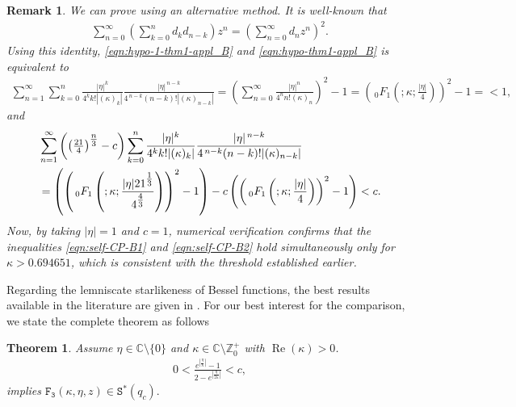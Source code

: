 \documentclass[a4paper,11pt,reqno]{amsart}
\newtheorem{theorem}{Theorem}[section]
\newtheorem{remark}{Remark}[section]
\DeclareMathOperator{\real}{Re}
\begin{document}
\begin{remark}
   We can prove  using an alternative method. It is well-known that 
   \begin{align}\label{eqn:self-CP}
       \sum_{n=0}^{\infty} \left( \sum_{k=0}^n d_k d_{n-k} \right) z^n = \left(\sum_{n=0}^{\infty}  d_n  z^n \right)^2. 
   \end{align}
Using this identity, \eqref{eqn:hypo-1-thm1-appl_B} and  \eqref{eqn:hypo-thm1-appl_B} is equivalent to 
   \begin{align}\label{eqn:self-CP-B1}
\sum_{n=1}^{\infty}  \sum_{k=0}^n  \frac{|\eta|^{k}}{4^k k! |(\kappa)_{k}|}  \frac{|\eta|^{\,n-k}}{4^{\,n-k} (n-k)! |(\kappa)_{n-k}|} =\left(\sum_{n=0}^{\infty} \frac{|\eta|^{n}}{4^n n! (\kappa)_{n}}\right)^2 -1={\left(\, _0F_1\left(;\kappa ;\frac{|\eta|}{4}\right)\right)}^2 -1  = < 1,
\end{align}
and 
\begin{align}\label{eqn:self-CP-B2} \notag
&\sum_{n=1}^{\infty} \left( \left(\tfrac{21}{4}\right)^{\tfrac{n}{3}}- c\right) \sum_{k=0}^n  \frac{|\eta|^{k}}{4^k k! |(\kappa)_{k}|}  \frac{|\eta|^{\,n-k}}{4^{\,n-k} (n-k)! |(\kappa)_{n-k}|}\\&=\left({\left(\, _0F_1\left(;\kappa ;\frac{|\eta| 21^{\tfrac{1}{3}}}{4^{\tfrac{4}{3}}}\right)\right)}^2 -1\right)- c \left( {\left(\, _0F_1\left(;\kappa ;\frac{|\eta|}{4}\right)\right)}^2 -1\right)<c. 
\end{align}
Now, by taking $|\eta|=1$ and $c=1$, numerical verification confirms that the inequalities \eqref{eqn:self-CP-B1} and \eqref{eqn:self-CP-B2} hold simultaneously only for $\kappa >0.694651$, which is consistent with the threshold established earlier. 
\end{remark}
    

















 Regarding the lemniscate starlikeness of Bessel functions, the best results available in the literature are given in \cite{Zayed-Bulboacua}. For our best interest for the comparison, we state the complete theorem as follows

\begin{theorem}\label{thm-Zayed-LS}\cite{Zayed-Bulboacua}
    Assume $\eta \in \mathbb{C}\setminus \{0\}$ and $\kappa \in \mathbb{C}\setminus \mathbb{Z}_0^{+}$ with $\real(\kappa)>0$. 
    \begin{align*}
        0 < \frac{e^{\left|\tfrac{\eta}{\kappa}\right|}-1}{2-e^{\left|\tfrac{\eta}{2\kappa}\right|}}< c,
    \end{align*}
implies $ \mathtt{F_3}(\kappa, \eta, z) \in \mathtt{S}^{\ast}(q_c). $
\end{theorem}
\end{document}
